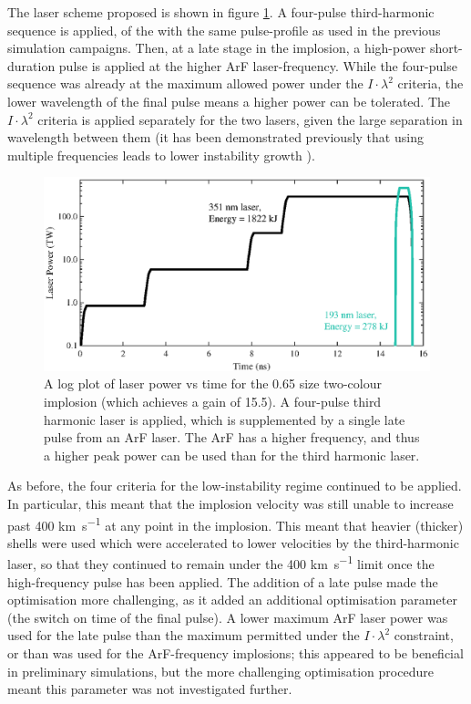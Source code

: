 The laser scheme proposed is shown in figure \ref{fig:Two colour sequence}. A four-pulse third-harmonic sequence is applied, of the with the same pulse-profile as used in the previous simulation campaigns. Then, at a late stage in the implosion, a high-power short-duration pulse is applied at the higher ArF laser-frequency. While the four-pulse sequence was already at the maximum allowed power under the $I \cdot \lambda^2$ criteria, the lower wavelength of the final pulse means a higher power can be tolerated. The $I \cdot \lambda^2$ criteria is applied separately for the two lasers, given the large separation in wavelength between them (it has been demonstrated previously that using multiple frequencies leads to lower instability growth \cite{Follett2018}).

\begin{figure}[ht]
\centering
\includegraphics{figures/FurtherSims/TwoColourLaser.eps}
\caption{A log plot of laser power vs time for the 0.65 size two-colour implosion (which achieves a gain of 15.5). A four-pulse third harmonic laser is applied, which is supplemented by a single late pulse from an ArF laser. The ArF has a higher frequency, and thus a higher peak power can be used than for the third harmonic laser.}
\label{fig:Two colour sequence}
\end{figure}

As before, the four criteria for the low-instability regime continued to be applied. In particular, this meant that the implosion velocity was still unable to increase past 400 \unit{\kilo\meter\per\second} at any point in the implosion. This meant that heavier (thicker) shells were used which were accelerated to lower velocities by the third-harmonic laser, so that they continued to remain under the 400 \unit{\kilo\meter\per\second} limit once the high-frequency pulse has been applied. The addition of a late pulse made the optimisation more challenging, as it added an additional optimisation parameter (the switch on time of the final pulse). A  lower maximum ArF laser power was used for the late pulse than the maximum permitted under the $I \cdot \lambda^2$ constraint, or than was used for the ArF-frequency implosions; this appeared to be beneficial in preliminary simulations, but the more challenging optimisation procedure meant this parameter was not investigated further. 

